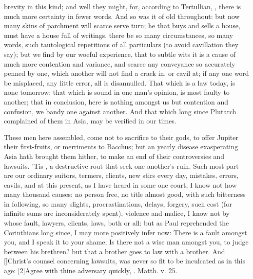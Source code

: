 {brevity in this kind; and well they might, for, according to
Tertullian, , there is much more certainty in
fewer words. And so was it of old throughout: but now many skins of
parchment will scarce serve turn; he that buys and sells a house, must
have a house full of writings, there be so many circumstances, so many
words, such tautological repetitions of all particulars (to avoid
cavillation they say); but we find by our woeful experience, that to
subtle wits it is a cause of much more contention and variance, and
scarce any conveyance so accurately penned by one, which another will
not find a crack in, or cavil at; if any one word be misplaced, any
little error, all is disannulled. That which is a law today, is none
tomorrow; that which is sound in one man's opinion, is most faulty to
another; that in conclusion, here is nothing amongst us but contention
and confusion, we bandy one against another. And that which long since
Plutarch complained of them in Asia, may be verified in our times.

These men here assembled, come not to sacrifice to their gods, to offer
Jupiter their first-fruits, or merriments to Bacchus; but an yearly
disease exasperating Asia hath brought them hither, to make an end of
their controversies and lawsuits. 'Tis , a destructive rout that seek one another's ruin. Such most
part are our ordinary suitors, termers, clients, new stirs every day,
mistakes, errors, cavils, and at this present, as I have heard in some
one court, I know not how many thousand causes: no person free, no
title almost good, with such bitterness in following, so many slights,
procrastinations, delays, forgery, such cost (for infinite sums are
inconsiderately spent), violence and malice, I know not by whose fault,
lawyers, clients, laws, both or all: but as Paul reprehended the
Corinthians long since, I may more positively infer now: There is
a fault amongst you, and I speak it to your shame, Is there not a
wise man amongst you, to judge between his brethren? but that a
brother goes to law with a brother. And [\baselineskip]Christ's counsel
concerning lawsuits, was never so fit to be inculcated as in this age:
[2\baselineskip]Agree with thine adversary quickly, \etc{}. Matth. v. 25.

}
